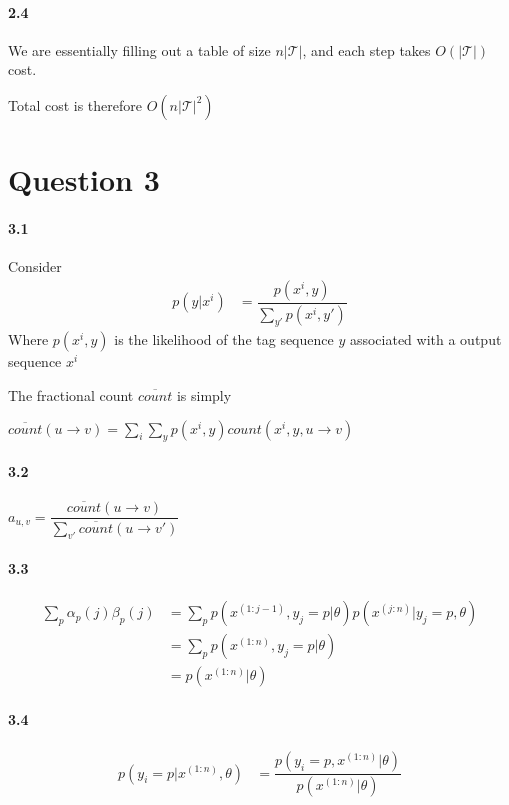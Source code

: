 \documentclass[10pt,letter]{article}
\begin{document}
\paragraph*{2.4}
We are essentially filling out a table of size $n|\mathcal{T}|$, and each step takes $O(|\mathcal{T}|)$ cost. 

Total cost is therefore $O(n|\mathcal{T}|^2)$









\section*{Question 3}

\paragraph*{3.1}

Consider
\begin{align*}
p(y|x^i) &= \dfrac{p(x^i,y)}{ \sum_{y'} p(x^i, y') }
\end{align*}
Where $p(x^i,y)$ is the likelihood of the tag sequence $y$ associated with a output sequence $x^i$

The fractional count $\overline{count}$ is simply

$ \overline{count}(u\rightarrow v) = \sum_{i} \sum_{y} p(x^i,y) count(x^i, y, u\rightarrow v) $

\paragraph*{3.2}

$a_{u,v} = \dfrac{ \overline{count}(u\rightarrow v) }{ \sum_{v'} \overline{count}(u\rightarrow v') }$

\paragraph*{3.3}
\begin{align*}
\sum_{p} \alpha_p(j) \beta_p(j) &= \sum_{p} p(x^{(1:j-1)}, y_j = p|\theta ) p(x^{(j:n)}| y_j = p, \theta  ) \\
&= \sum_{p} p(  x^{(1:n)} , y_j=p|\theta ) \\
&= p(x^{(1:n)} | \theta)
\end{align*}


\paragraph*{3.4}
\begin{align*}
p(y_i=p | x^{(1:n)}, \theta) &= \dfrac{p(y_i=p, x^{(1:n)}|\theta)}{p(x^{(1:n)}|\theta)}
\end{align*}
\end{document}
